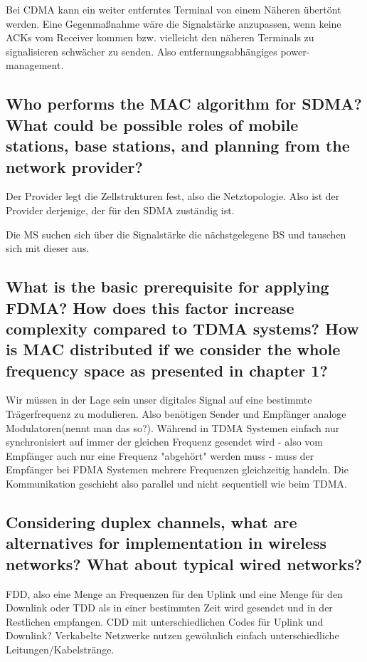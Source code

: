 Bei CDMA kann ein weiter entferntes Terminal von einem Näheren übertönt werden. Eine Gegenmaßnahme wäre die Signalstärke anzupassen, wenn keine ACKs vom Receiver kommen bzw. vielleicht den näheren Terminals zu signalisieren schwächer zu senden. Also entfernungsabhängiges power-management.


\subsection{Who performs the MAC algorithm for SDMA? What could be possible roles of mobile
stations, base stations, and planning from the network provider?}

Der Provider legt die Zellstrukturen fest, also die Netztopologie. Also ist der Provider derjenige, der für den SDMA zuständig ist.

Die MS suchen sich über die Signalstärke die nächstgelegene BS und tauschen sich mit dieser aus. 

\subsection{What is the basic prerequisite for applying FDMA? How does this factor increase
complexity compared to TDMA systems? How is MAC distributed if we consider the
whole frequency space as presented in chapter 1?}
Wir müssen in der Lage sein unser digitales Signal auf eine bestimmte Trägerfrequenz zu modulieren. Also benötigen Sender und Empfänger analoge Modulatoren(nennt man das so?).
Während in TDMA Systemen einfach nur synchronisiert auf immer der gleichen Frequenz gesendet wird - also vom Empfänger auch nur eine Frequenz "abgehört" werden muss - muss der Empfänger bei FDMA Systemen mehrere Frequenzen gleichzeitig handeln. Die Kommunikation geschieht also parallel und nicht sequentiell wie beim TDMA.


\subsection{Considering duplex channels, what are alternatives for implementation in wireless
networks? What about typical wired networks?}
FDD, also eine Menge an Frequenzen für den Uplink und eine Menge für den Downlink oder TDD als in einer bestimmten Zeit wird gesendet und in der Restlichen empfangen.
CDD mit unterschiedlichen Codes für Uplink und Downlink?
Verkabelte Netzwerke nutzen gewöhnlich einfach unterschiedliche Leitungen/Kabelstränge.

